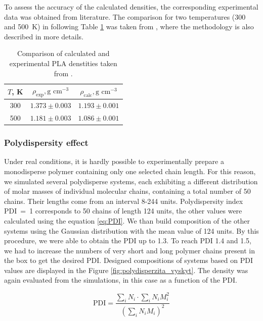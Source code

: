 To assess the accuracy of the calculated densities, the corresponding experimental data was obtained from literature. The comparison for two temperatures (300 and 500~K) in following Table \ref{tab:PLA_dens} was taken from \cite{klajmon_glass_2023}, where the methodology is also described in more details.

\begin{table}[htbp]
	\centering
	\caption{Comparison of calculated and experimental PLA denstities taken from \cite{klajmon_glass_2023}.}
	\begin{tabular}{ccc}
		\toprule
		$T$, K & $\rho_{\text{exp}},  \text{g cm}^{-3}$ & $\rho_{\text{calc}}, \text{g cm}^{-3}$ \\
		\midrule
		 300   & $1.373 \pm 0.003$ & $1.193 \pm 0.001$ \\
		 500   & $1.181 \pm 0.003$ & $1.086 \pm 0.001$ \\
		\bottomrule
	\end{tabular}%
	\label{tab:PLA_dens}%
\end{table}%

\subsubsection{Polydispersity effect}
Under real conditions, it is hardly possible to experimentally prepare a monodisperse polymer containing only one selected chain length. For this reason, we simulated several polydisperse systems, each exhibiting a different distribution of molar masses of individual molecular chains, containing a total number of 50 chains. Their lengths come from an interval 8-244 units. Polydispersity index PDI~=~1 corresponds to 50 chains of length 124 units, the other values were calculated using the equation \ref{eq:PDI}. We than build composition of the other systems using the Gaussian distribution with the mean value of 124 units. By this procedure, we were able to obtain the PDI up to 1.3. To reach PDI 1.4 and 1.5, we had to increase the numbers of very short and long polymer chains present in the box to get the desired PDI. Designed compositions of systems based on PDI values are displayed in the Figure \ref{fig:polydisperzita_vyskyt}. The density was again evaluated from the simulations, in this case as a function of the PDI.

\begin{equation}
	\text{PDI} = \frac{\sum_{i} N_{i} \cdot \sum_{i} N_{i} M_{i}^2}{\left(\sum_{i} N_{i} M_{i}\right)^2}
	\label{eq:PDI}
\end{equation}


